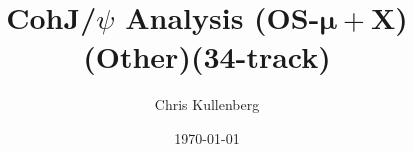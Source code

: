 \title{CohJ/$\psi$ Analysis (\textbf{OS}-$\boldsymbol{\mu+}$\textbf{X})(\textbf{Other})(\textbf{34-track})}
\author{Chris Kullenberg}
\date{\today}
